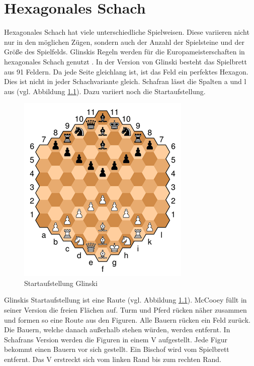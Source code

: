 \chapter{Hexagonales Schach}

Hexagonales Schach hat viele unterschiedliche Spielweisen. Diese variieren nicht nur in den möglichen Zügen, sondern auch der Anzahl der Spielsteine und der Größe des Spielfelds. Glinskis Regeln werden für die Europameisterschaften in hexagonales Schach genutzt \cite{Gados:Hexagonal}. In der Version von Glinski besteht das Spielbrett aus 91 Feldern. Da jede Seite gleichlang ist, ist das Feld ein perfektes Hexagon. Dies ist nicht in jeder Schachvariante gleich. Schafran lässt die Spalten a und l aus (vgl. Abbildung \ref{fig:hex:start}). Dazu variiert noch die Startaufstellung.

\begin{figure}[H]
    \centering
    \includegraphics{images/hexStart.png}
    \caption{Startaufstellung Glinski \protect\footnotemark}
    \label{fig:hex:start}
\end{figure}

Glinskis Startaufstellung ist eine Raute (vgl. Abbildung \ref{fig:hex:start}). McCooey füllt in seiner Version die freien Flächen auf. Turm und Pferd rücken näher zusammen und formen so eine Route aus den Figuren. Alle Bauern rücken ein Feld zurück. Die Bauern, welche danach außerhalb stehen würden, werden entfernt. In Schafrans Version werden die Figuren in einem V  aufgestellt. Jede Figur bekommt einen Bauern vor sich gestellt. Ein Bischof wird vom Spielbrett entfernt. Das V erstreckt sich vom linken Rand bis zum rechten Rand. \cite{GlinskiHexaChess}\cite{McCoeeyHexaChess}\cite{SchafranHexaChess}



